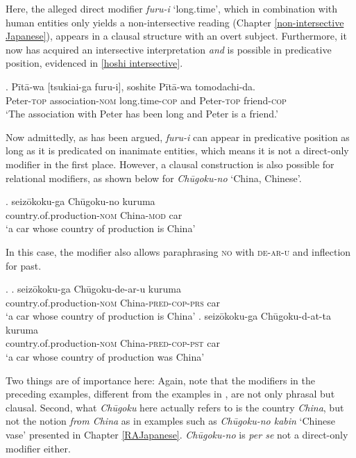 \documentclass [output=book,colorlinks,citecolor=brown]{langscibook}
\begin{document}
Here, the alleged direct modifier \textit{furu-i} `long.time’, which in combination with human entities only yields a non-intersective reading (Chapter \ref{non-intersective Japanese}), appears in a clausal structure with an overt subject. Furthermore, it now has acquired an intersective interpretation \textit{and} is possible in predicative position, evidenced in \ref{hoshi intersective}.

\exg. Pītā-wa [tsukiai-ga furu-i], soshite Pītā-wa tomodachi-da.\\
Peter-\textsc{top} association-\textsc{nom} long.time-\textsc{cop} and Peter-\textsc{top} friend-\textsc{cop}\\
`The association with Peter has been long and Peter is a friend.’ \\ \null \hfill \citep[11]{hoshi:2002:kaynean} \label{hoshi intersective}

Now admittedly, as has been argued, \textit{furu-i} can appear in predicative position as long as it is predicated on inanimate entities, which means it is not a direct-only modifier in the first place. However, a clausal construction is also possible for relational modifiers, as shown below for \textit{Chūgoku-no} `China, Chinese’. %

\exg. seizōkoku-ga Chūgoku-no kuruma\\
country.of.production-\textsc{nom} China-\textsc{mod} car\\
`a car whose country of production is China’

In this case, the modifier also allows paraphrasing \textsc{no} with \textsc{de-ar-u} and inflection for past.

\ex. \ag. seizōkoku-ga Chūgoku-de-ar-u kuruma\\
country.of.production-\textsc{nom} China-\textsc{pred-cop-prs} car\\
`a car whose country of production is China’ 
\bg. seizōkoku-ga Chūgoku-d-at-ta kuruma\\
country.of.production-\textsc{nom} China-\textsc{pred-cop-pst} car\\
`a car whose country of production was China’

Two things are of importance here: Again, note that the modifiers in the preceding examples, different from the examples in \citet{cinque:2010:adj}, are not only phrasal but clausal. Second, what \textit{Chūgoku} here actually refers to is the country \textit{China}, but not the notion \textit{from China} as in examples such as \textit{Chūgoku-no kabin} `Chinese vase’ presented in Chapter \ref{RAJapanese}. \textit{Chūgoku-no} is \textit{per se} not a direct-only modifier either. %
\end{document}
